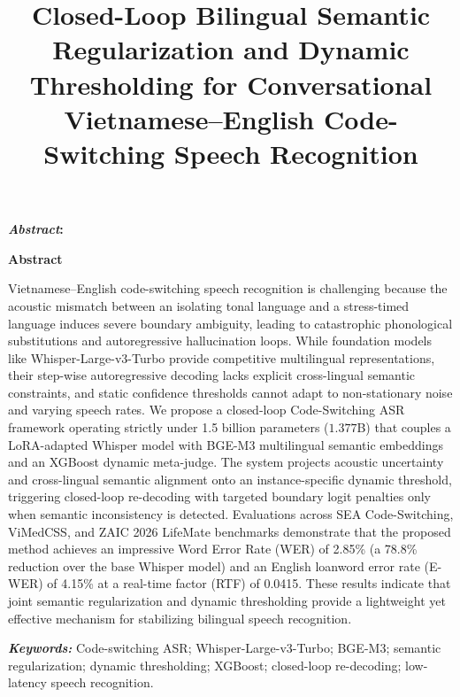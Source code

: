 \documentclass[9pt, conference, a4paper, compsocconf]{IEEEtran}
\makeatletter
\renewenvironment{abstract}
  {\normalfont
   \@IEEEabskeysecsize
   \setlength{\parindent}{0pt}
   \noindent
   \if@twocolumn
     \bfseries\textit{\abstractname}: 
   \else
     \begin{center}\textbf{\abstractname}\end{center}
   \fi}
  {\par}
\renewenvironment{IEEEkeywords}
  {\normalfont
   \@IEEEabskeysecsize
   \vspace{0.3em}       
   \setlength{\parindent}{0pt}
   \noindent
   {\bfseries\itshape \IEEEkeywordsname: }\ignorespaces}
  {\par}
\renewcommand{\abstractname}{Abstract}
\renewcommand{\IEEEkeywordsname}{Keywords}
\makeatother
\begin{document}
\fontsize{9}{10}
\selectfont


\title{Closed-Loop Bilingual Semantic Regularization and Dynamic Thresholding for Conversational Vietnamese–English Code-Switching Speech Recognition}

\maketitle

\begin{abstract}
Vietnamese--English code-switching speech recognition is challenging because the acoustic mismatch between an isolating tonal language and a stress-timed language induces severe boundary ambiguity, leading to catastrophic phonological substitutions and autoregressive hallucination loops. While foundation models like Whisper-Large-v3-Turbo provide competitive multilingual representations, their step-wise autoregressive decoding lacks explicit cross-lingual semantic constraints, and static confidence thresholds cannot adapt to non-stationary noise and varying speech rates. We propose a closed-loop Code-Switching ASR framework operating strictly under 1.5 billion parameters ($1.377$B) that couples a LoRA-adapted Whisper model with BGE-M3 multilingual semantic embeddings and an XGBoost dynamic meta-judge. The system projects acoustic uncertainty and cross-lingual semantic alignment onto an instance-specific dynamic threshold, triggering closed-loop re-decoding with targeted boundary logit penalties only when semantic inconsistency is detected. Evaluations across SEA Code-Switching, ViMedCSS, and ZAIC 2026 LifeMate benchmarks demonstrate that the proposed method achieves an impressive Word Error Rate (WER) of 2.85\% (a 78.8\% reduction over the base Whisper model) and an English loanword error rate (E-WER) of 4.15\% at a real-time factor (RTF) of 0.0415. These results indicate that joint semantic regularization and dynamic thresholding provide a lightweight yet effective mechanism for stabilizing bilingual speech recognition.
\end{abstract}

\begin{IEEEkeywords}
Code-switching ASR; Whisper-Large-v3-Turbo; BGE-M3; semantic regularization; dynamic thresholding; XGBoost; closed-loop re-decoding; low-latency speech recognition.
\end{IEEEkeywords}
\end{document}
